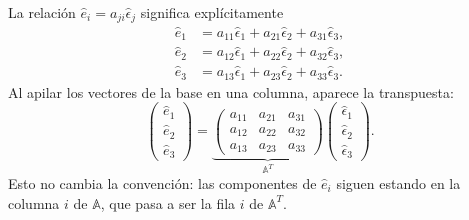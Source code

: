 La relación $\hat e_i=a_{ji}\hat\epsilon_j$ significa explícitamente
\[
\begin{aligned}
\hat e_1&=a_{11}\hat\epsilon_1+a_{21}\hat\epsilon_2+a_{31}\hat\epsilon_3,\\
\hat e_2&=a_{12}\hat\epsilon_1+a_{22}\hat\epsilon_2+a_{32}\hat\epsilon_3,\\
\hat e_3&=a_{13}\hat\epsilon_1+a_{23}\hat\epsilon_2+a_{33}\hat\epsilon_3.
\end{aligned}
\]
Al apilar los vectores de la base en una columna, aparece la transpuesta:
\[
\begin{pmatrix}\hat e_1\\\hat e_2\\\hat e_3\end{pmatrix}
=\underbrace{\begin{pmatrix}
a_{11}&a_{21}&a_{31}\\
a_{12}&a_{22}&a_{32}\\
a_{13}&a_{23}&a_{33}
\end{pmatrix}}_{\mathbb A^T}
\begin{pmatrix}\hat\epsilon_1\\\hat\epsilon_2\\\hat\epsilon_3\end{pmatrix}.
\]
Esto no cambia la convención: las componentes de $\hat e_i$ siguen estando en la columna $i$ de $\mathbb A$, que pasa a ser la fila $i$ de $\mathbb A^T$.

